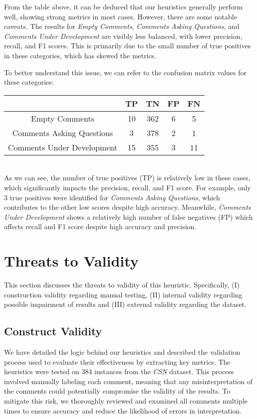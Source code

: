 \noindent From the table above, it can be deduced that our heuristics generally perform well, showing strong metrics in most cases. However, there are some notable caveats. The results for \textit{Empty Comments}, \textit{Comments Asking Questions}, and \textit{Comments Under Development} are visibly less balanced, with lower precision, recall, and F1 scores. This is primarily due to the small number of true positives in these categories, which has skewed the metrics.

\noindent To better understand this issue, we can refer to the confusion matrix values for these categories:
\begin{center}
	\begin{tabular}{|c|c|c|c|c|}
		\hline
		& \textbf{TP} & \textbf{TN} & \textbf{FP} & \textbf{FN} \\
		\hline Empty Comments             & 10     & 362      & 6   & 5    \\
		\hline Comments Asking Questions  & 3     & 378      & 2   & 1    \\
		\hline Comments Under Development & 15     & 355      & 3   & 11    \\
		\hline
	\end{tabular}
\end{center}

\noindent \\ As we can see, the number of true positives (TP) is relatively low in these cases, which significantly impacts the precision, recall, and F1 score. For example, only 3 true positives were identified for \textit{Comments Asking Questions}, which contributes to the other low scores despite high accuracy. Meanwhile, \textit{Comments Under Development} shows a relatively high number of false negatives (FP) which affects recall and F1 score despite high accuracy and precision.

\section{Threats to Validity}
This section discusses the threats to validity of this heuristic. Specifically, (I) construction validity regarding manual testing, (II) internal validity regarding possible impairment of results and (III) external validity regarding the dataset.

\subsection{Construct Validity}
We have detailed the logic behind our heuristics and described the validation process used to evaluate their effectiveness by extracting key metrics. The heuristics were tested on 384 instances from the \textit{CSN} dataset. This process involved manually labeling each comment, meaning that any misinterpretation of the comments could potentially compromise the validity of the results. To mitigate this risk, we thoroughly reviewed and examined all comments multiple times to ensure accuracy and reduce the likelihood of errors in interpretation.


